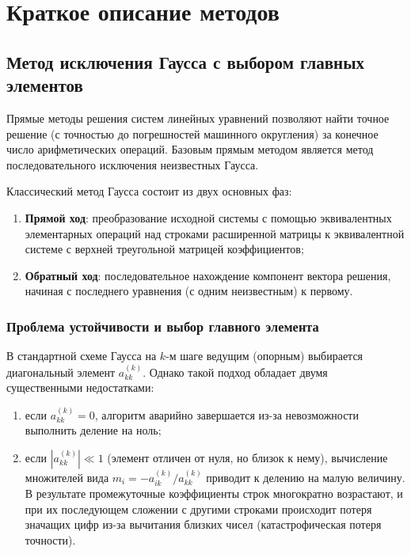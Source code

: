 \chapter{Краткое описание методов}

\section{Метод исключения Гаусса с выбором главных элементов}

Прямые методы решения систем линейных уравнений позволяют найти точное решение (с точностью до погрешностей машинного округления) за конечное число арифметических операций. Базовым прямым методом является метод последовательного исключения неизвестных Гаусса.

Классический метод Гаусса состоит из двух основных фаз:
\begin{enumerate}
    \item \textbf{Прямой ход}: преобразование исходной системы с помощью эквивалентных элементарных операций над строками расширенной матрицы к эквивалентной системе с верхней треугольной матрицей коэффициентов;
    \item \textbf{Обратный ход}: последовательное нахождение компонент вектора решения, начиная с последнего уравнения (с одним неизвестным) к первому.
\end{enumerate}

\subsection{Проблема устойчивости и выбор главного элемента}

В стандартной схеме Гаусса на $k$-м шаге ведущим (опорным) выбирается диагональный элемент $a_{kk}^{(k)}$. Однако такой подход обладает двумя существенными недостатками:
\begin{enumerate}
    \item если $a_{kk}^{(k)} = 0$, алгоритм аварийно завершается из-за невозможности выполнить деление на ноль;
    \item если $|a_{kk}^{(k)}| \ll 1$ (элемент отличен от нуля, но близок к нему), вычисление множителей вида $m_i = -a_{ik}^{(k)} / a_{kk}^{(k)}$ приводит к делению на малую величину. В результате промежуточные коэффициенты строк многократно возрастают, и при их последующем сложении с другими строками происходит потеря значащих цифр из-за вычитания близких чисел (катастрофическая потеря точности).
\end{enumerate}

